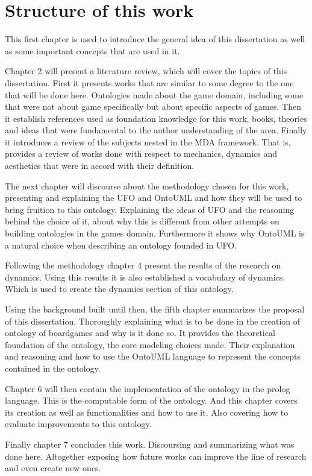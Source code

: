 \section{Structure of this work}

This first chapter is used to introduce the general idea of this dissertation as well as some important concepts that are used in it.

Chapter 2 will present a literature review, which will cover the topics of this dissertation. First it presents works that are similar to some degree to the one that will be done here. Ontologies made about the game domain, including some that were not about game specifically but about specific aspects of games. Then it establish references used as foundation knowledge for this work, books, theories and ideas that were fundamental to the author understanding of the area. Finally it introduces a review of the subjects nested in the MDA framework. That is, provides a review of works done with respect to mechanics, dynamics and aesthetics that were in accord with their definition.

The next chapter will discourse about the methodology chosen for this work, presenting and explaining the UFO and OntoUML and how they will be used to bring fruition to this ontology. Explaining the ideas of UFO and the reasoning behind the choice of it, about why this is different from other attempts on building ontologies in the games domain. Furthermore it shows why OntoUML is a natural choice when describing an ontology founded in UFO. 

Following the methodology chapter 4 present the results of the research on dynamics. Using this results it is also established a vocabulary of dynamics. Which is used to create the dynamics section of this ontology.

Using the background built until then, the fifth chapter summarizes the proposal of this dissertation. Thoroughly explaining what is to be done in the creation of ontology of boardgames and why is it done so. It provides the theoretical foundation of the ontology, the core modeling choices made. Their explanation and reasoning and how to use the OntoUML language to represent the concepts contained in the ontology.

Chapter 6 will then contain the implementation of the ontology in the prolog language. This is the computable form of the ontology. And this chapter covers its creation as well as functionalities and how to use it. Also covering how to evaluate improvements to this ontology.

Finally chapter 7 concludes this work. Discoursing and summarizing what was done here. Altogether exposing how future works can improve the line of research and even create new ones.

